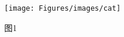\newpage
{}

\setcounter{page}{1}
\begin{figure}[H]
    \begin{center}
        \texttt{[image: Figures/images/cat]}
    \end{center}
    \begin{center}
        \qquad \qquad 图1
    \end{center}
    \label{fig:tstmp20211203103404}
\end{figure}